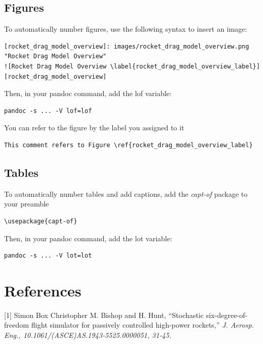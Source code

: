\documentclass[]{article}
\begin{document}
\subsection{Figures}\label{figures}

To automatically number figures, use the following syntax to insert an
image:

\begin{verbatim}
[rocket_drag_model_overview]: images/rocket_drag_model_overview.png "Rocket Drag Model Overview" 
![Rocket Drag Model Overview \label{rocket_drag_model_overview_label}][rocket_drag_model_overview] 
\end{verbatim}

Then, in your pandoc command, add the lof variable:

\begin{verbatim}
pandoc -s ... -V lof=lof
\end{verbatim}

You can refer to the figure by the label you assigned to it

\begin{verbatim}
This comment refers to Figure \ref{rocket_drag_model_overview_label}
\end{verbatim}

\subsection{Tables}\label{tables}

To automatically number tables and add captions, add the \emph{capt-of}
package to your preamble

\begin{verbatim}
\usepackage{capt-of}
\end{verbatim}

Then, in your pandoc command, add the lot variable:

\begin{verbatim}
pandoc -s ... -V lot=lot
\end{verbatim}

\section*{References}\label{references}

{[}1{]} Simon Box Christopher M. Bishop and H. Hunt, ``Stochastic
six-degree-of-freedom flight simulator for passively controlled
high-power rockets,'' \emph{J. Aerosp. Eng.,
10.1061/(ASCE)AS.1943-5525.0000051, 31-45.}
\end{document}
